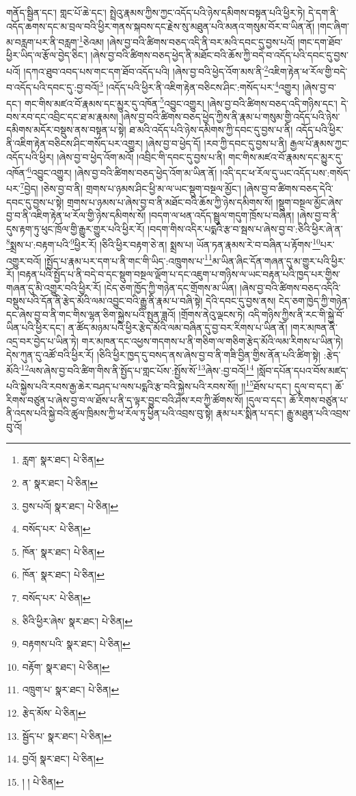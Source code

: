 གནོད་སྦྱིན་དང་། གླང་པོ་ཆེ་དང་། སྤྲེའུ་རྣམས་ཀྱིས་ཀྱང་འདོད་པའི་ཉེས་དམིགས་བསྟན་པའི་ཕྱིར་ཏེ། དེ་དག་ནི་འདོད་ཆགས་དང་མ་བྲལ་བའི་ཕྱིར་གནས་སྐབས་དང་རྗེས་སུ་མཐུན་པའི་མནའ་གསུམ་བོར་བ་ཡིན་ནོ། །གང་ཞིག་མ་བརླག་པར་ནི་བརླག་\footnote{རླག་  སྣར་ཐང་།  པེ་ཅིན། }ཅེའམ། །ཞེས་བྱ་བའི་ཚིགས་བཅད་འདི་ནི་བར་མའི་དབང་དུ་བྱས་པའོ། །གང་དག་ཐོབ་ཕྱིར་ཡིད་ལ་རྩོལ་བྱེད་ཅིང་། །ཞེས་བྱ་བའི་ཚིགས་བཅད་ཕྱེད་ནི་མཐོང་བའི་ཆོས་ཀྱི་བདེ་བ་འདོད་པའི་དབང་དུ་བྱས་པའོ། །དཀའ་ཐུབ་འབད་པས་གང་དག་ཐོབ་འདོད་པའི། །ཞེས་བྱ་བའི་ཕྱེད་འོག་མས་ནི་\footnote{ན་  སྣར་ཐང་།  པེ་ཅིན། }འཇིག་རྟེན་ཕ་རོལ་གྱི་བདེ་བ་འདོད་པའི་དབང་དུ་:བྱ་བའོ།\footnote{བྱས་པའོ།  སྣར་ཐང་།  པེ་ཅིན། } །འདོད་པའི་ཕྱིར་ནི་འཇིག་རྟེན་བཅིངས་ཤིང་:གསོད་པར་\footnote{བསོད་པར་  པེ་ཅིན། }འགྱུར། །ཞེས་བྱ་བ་དང་། གང་གིས་མཛའ་བོ་རྣམས་དང་མྱུར་དུ་འཁོན་\footnote{ཁོན་  སྣར་ཐང་།  པེ་ཅིན། }འབྱུང་འགྱུར། །ཞེས་བྱ་བའི་ཚིགས་བཅད་འདི་གཉིས་དང་། དེ་བས་རབ་དང་འབྲིང་དང་ཐ་མ་རྣམས། །ཞེས་བྱ་བའི་ཚིགས་བཅད་ཕྱེད་ཀྱིས་ནི་རྣམ་པ་གསུམ་གྱི་འདོད་པའི་ཉེས་དམིགས་མདོར་བསྡུས་ནས་བསྟན་པ་སྟེ། ཐ་མའི་འདོད་པའི་ཉེས་དམིགས་ཀྱི་དབང་དུ་བྱས་པ་ནི། འདོད་པའི་ཕྱིར་ནི་འཇིག་རྟེན་བཅིངས་ཤིང་གསོད་པར་འགྱུར། །ཞེས་བྱ་བ་ཕྱེད་དོ། །རབ་ཀྱི་དབང་དུ་བྱས་པ་ནི། རྒྱལ་པོ་རྣམས་ཀྱང་འདོད་པའི་ཕྱིར། །ཞེས་བྱ་བ་ཕྱེད་འོག་མའོ། །འབྲིང་གི་དབང་དུ་བྱས་པ་ནི། གང་གིས་མཛའ་བོ་རྣམས་དང་མྱུར་དུ་འཁོན་\footnote{ཁོན་  སྣར་ཐང་།  པེ་ཅིན། }འབྱུང་འགྱུར། །ཞེས་བྱ་བའི་ཚིགས་བཅད་ཕྱེད་འོག་མ་ཡིན་ནོ། །འདི་དང་ཕ་རོལ་དུ་ཡང་འདོད་པས་:གསོད་པར་\footnote{བསོད་པར་  པེ་ཅིན། }བྱེད། །ཅེས་བྱ་བ་ནི། གྲགས་པ་ཉམས་ཤིང་ཕྱི་མ་ལ་ཡང་སྡུག་བསྔལ་མྱོང་། །ཞེས་བྱ་བ་ཚིགས་བཅད་དེའི་དབང་དུ་བྱས་པ་སྟེ། གྲགས་པ་ཉམས་པ་ཞེས་བྱ་བ་ནི་མཐོང་བའི་ཆོས་ཀྱི་ཉེས་དམིགས་སོ། །སྡུག་བསྔལ་མྱོང་ཞེས་བྱ་བ་ནི་འཇིག་རྟེན་ཕ་རོལ་གྱི་ཉེས་དམིགས་སོ། །བདག་ལ་ཕན་འདོད་སྦྲུལ་གདུག་ཁྲོས་པ་བཞིན། །ཞེས་བྱ་བ་ནི་དུས་རྟག་ཏུ་ཕུང་ཁྲོལ་གྱི་རྒྱུར་གྱུར་པའི་ཕྱིར་རོ། །བདག་གིས་འདིར་པདྨའི་རྩ་བ་སྦས་པ་ཞེས་བྱ་བ་:ཅིའི་ཕྱིར་ཞེ་ན་\footnote{ཅིའི་ཕྱིར་ཞེས་  སྣར་ཐང་།  པེ་ཅིན། }སྨྲས་པ་:བརྟག་པའི་\footnote{བརྟགས་པའི་  སྣར་ཐང་།  པེ་ཅིན། }ཕྱིར་རོ། །ཅིའི་ཕྱིར་བརྟག་ཅེ་ན། སྨྲས་པ། ཡོན་ཏན་རྣམས་རེ་བ་བཞིན་པ་རྟོགས་\footnote{བརྟོག་  སྣར་ཐང་།  པེ་ཅིན། }པར་འགྱུར་བའོ། །སྤྱོད་པ་རྣམ་པར་དག་པ་ནི་གང་གི་ཡིད་:འཁྲུགས་པ་\footnote{འཁྲུག་པ་  སྣར་ཐང་།  པེ་ཅིན། }མ་ཡིན་ཞིང་དོན་གཞན་དུ་མ་གྱུར་པའི་ཕྱིར་རོ། །བརྟན་པའི་སྤྱོད་པ་ནི་བདེ་བ་དང་སྡུག་བསྔལ་ལྡོག་པ་དང་འཇུག་པ་གཉིས་ལ་ཡང་བརྟན་པའི་ཁྱད་པར་གྱིས་གཞན་དུ་མི་འགྱུར་བའི་ཕྱིར་རོ། །ངེད་ཅག་ཁྱོད་ཀྱི་གཉེན་དང་གྲོགས་མ་ཡིན། །ཞེས་བྱ་བའི་ཚིགས་བཅད་འདིའི་བསྡུས་པའི་དོན་ནི་རྩེད་མོའི་ལམ་འབྱུང་བའི་རྒྱུ་ནི་རྣམ་པ་བཞི་སྟེ། དེའི་དབང་དུ་བྱས་ནས། ངེད་ཅག་ཁྱེད་ཀྱི་གཉེན་དང་ཞེས་བྱ་བ་ནི་གང་གིས་ལྷན་ཅིག་སྐྱེས་པའི་སྤུན་ཟླའོ། །གྲོགས་ནེའུ་ལྡངས་ཏེ། འདི་གཉིས་ཀྱིས་ནི་རང་གི་སྐྱེ་བོ་ཡིན་པའི་ཕྱིར་དང་། ན་ཚོད་མཉམ་པའི་ཕྱིར་རྩེད་མོའི་ལམ་བཞིན་དུ་བྱ་བར་རིགས་པ་ཡིན་ནོ། །གར་མཁན་ནི་འདྲ་བར་བྱེད་པ་ཡིན་ཏེ། གར་མཁན་དང་འཕྱས་གདགས་པ་ནི་གཅིག་ལ་གཅིག་རྩེད་མོའི་ལམ་རིགས་པ་ཡིན་ཏེ། དེས་ཀུན་དུ་འཚོ་བའི་ཕྱིར་རོ། །ཅིའི་ཕྱིར་ཁྱད་དུ་བསད་ནས་ཞེས་བྱ་བ་ནི་གཟི་བྱིན་གྱིས་ནོན་པའི་ཚིག་སྟེ། :རྩེད་མོའི་\footnote{རྩེད་མོས་  པེ་ཅིན། }ལས་ཞེས་བྱ་བའི་ཚིག་གིས་ནི་སྤྱོད་པ་གླང་པོས་:སྤྱོས་སོ་\footnote{སྦྱོད་པ་  སྣར་ཐང་།  པེ་ཅིན། }ཞེས་:བྱ་བའོ།\footnote{བྱའོ།  སྣར་ཐང་།  པེ་ཅིན། } །སློབ་དཔོན་དཔའ་བོས་མཛད་པའི་སྐྱེས་པའི་རབས་རྒྱ་ཆེར་བཤད་པ་ལས་པདྨའི་རྩ་བའི་སྐྱེས་པའི་རབས་སོ།། །།\footnote{། །  པེ་ཅིན། }ཐོས་པ་དང་། དུལ་བ་དང་། ཆོ་རིགས་བཙུན་པ་ཞེས་བྱ་བ་ལ་ཐོས་པ་ནི་ད་ལྟར་བྱུང་བའི་ཤེས་རབ་ཀྱི་ཚོགས་སོ། །དུལ་བ་དང་། ཆོ་རིགས་བཙུན་པ་ནི་འདས་པའི་སྐྱེ་བའི་ཚུལ་ཁྲིམས་ཀྱི་ཕ་རོལ་ཏུ་ཕྱིན་པའི་འབྲས་བུ་སྟེ། རྣམ་པར་སྨིན་པ་དང་། རྒྱུ་མཐུན་པའི་འབྲས་བུ་འོ། 
